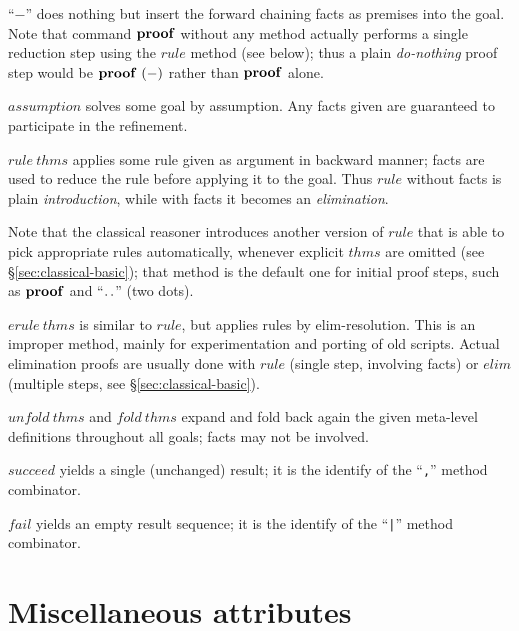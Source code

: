 \begin{descr}
\item [``$-$''] does nothing but insert the forward chaining facts as premises
  into the goal.  Note that command ${\mathord{\mathbf{proof}}}$ without any method actually
  performs a single reduction step using the $rule$ method (see below); thus a
  plain \emph{do-nothing} proof step would be $\PROOF{-}$ rather than
  ${\mathord{\mathbf{proof}}}$ alone.
\item [$assumption$] solves some goal by assumption.  Any facts given are
  guaranteed to participate in the refinement.
\item [$rule~thms$] applies some rule given as argument in backward manner;
  facts are used to reduce the rule before applying it to the goal.  Thus
  $rule$ without facts is plain \emph{introduction}, while with facts it
  becomes an \emph{elimination}.
  
  Note that the classical reasoner introduces another version of $rule$ that
  is able to pick appropriate rules automatically, whenever explicit $thms$
  are omitted (see \S\ref{sec:classical-basic}); that method is the default
  one for initial proof steps, such as ${\mathord{\mathbf{proof}}}$ and ``${\mathord{\mathbf{.\,.}}}$'' (two
  dots).
\item [$erule~thms$] is similar to $rule$, but applies rules by
  elim-resolution.  This is an improper method, mainly for experimentation and
  porting of old scripts.  Actual elimination proofs are usually done with
  $rule$ (single step, involving facts) or $elim$ (multiple steps, see
  \S\ref{sec:classical-basic}).
\item [$unfold~thms$ and $fold~thms$] expand and fold back again the given
  meta-level definitions throughout all goals; facts may not be involved.
\item [$succeed$] yields a single (unchanged) result; it is the identify of
  the ``\texttt{,}'' method combinator.
\item [$fail$] yields an empty result sequence; it is the identify of the
  ``\texttt{|}'' method combinator.
\end{descr}


\section{Miscellaneous attributes}

